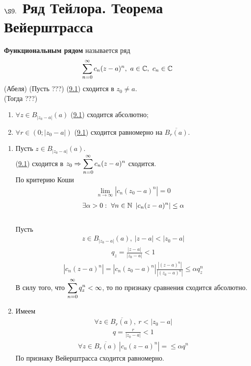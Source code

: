 \section{$\S 9.$ Ряд Тейлора. Теорема Вейерштрасса}
\Def
\textbf{Функциональным рядом} называется ряд
\begin{equation} \label{(9.1)}
    \sum_{n=0}^{\infty}c_n(z-a)^n, \ a \in \mathbb{C}, \ c_n \in \mathbb{C}
\end{equation}
\theorem (Абеля)
(Пусть ???) (\href{(9.1)}{9.1}) сходится в $z_0 \neq a$.
\\
(Тогда ???)
\begin{enumerate}
    \item $\forall z \in B_{\left| z_0 - a \right|}(a)$ (\href{(9.1)}{9.1})
    сходится абсолютно;
    \item $\forall r \in (0; \left| z_0-a \right|)$ (\href{(9.1)}{9.1}) сходится
    равномерно на $\overline{B_r(a)}$.
\end{enumerate}
\pr
\begin{enumerate}
    \item Пусть $z \in B_{\left| z_0-a \right|}(a)$.
    \\
    (\href{(9.1)}{9.1}) сходится в $z_0 \Rightarrow \displaystyle
    \sum_{n=0}^{\infty}c_n(z-a)^n$ сходится.
    \\
    По критерию Коши
    \begin{align*}
      \lim_{n \to \infty}\left| c_n(z_0-a)^n \right| = 0
    \end{align*}
    \begin{align*}
      \exists \alpha > 0: \ \forall n \in \mathbb{N} \ \left| c_n(z-a)^n \right| \leq \alpha
    \end{align*}
    \\
    Пусть
    \begin{align*}
      z \in B_{\left| z_0-a \right|}(a), \ \left| z-a \right|< \left| z_0-a \right|
    \end{align*}
    \begin{align*}
      q_z = \frac{\left| z-a \right|}{\left| z_0-a \right|} < 1
    \end{align*}
    \begin{align*}
      \left| c_n(z-a)^n \right| = \left| c_n(z_0-a)^n \right|\frac{\left| (z-a)^n \right|}{\left| (z_0-a)^n \right|} \leq \alpha q_z^n
    \end{align*}
    В силу того, что $\displaystyle \sum_{n=0}^{\infty}q_{z}^{n} < \infty$, то по
    признаку сравнения сходится абсолютно.
    \item Имеем
    \begin{align*}
      \forall z \in \overline{B_{r}(a)}, \ r < \left| z_0-a \right|
    \end{align*}
    \begin{align*}
      q = \frac{r}{\left| z_0-a \right|} < 1
    \end{align*}
    \begin{align*}
      \forall z \in \overline{B_r(a)} \ \left| c_n(z-a)^n \right| = \leq \alpha q^n
    \end{align*}
    По признаку Вейерштрасса сходится равномерно.
\end{enumerate}
